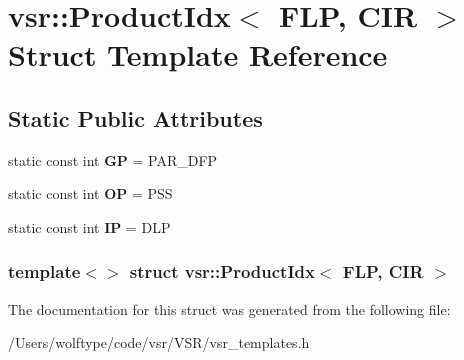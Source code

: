 \hypertarget{structvsr_1_1_product_idx_3_01_f_l_p_00_01_c_i_r_01_4}{\section{vsr\-:\-:Product\-Idx$<$ F\-L\-P, C\-I\-R $>$ Struct Template Reference}
\label{structvsr_1_1_product_idx_3_01_f_l_p_00_01_c_i_r_01_4}
}
\subsection*{Static Public Attributes}
\begin{DoxyCompactItemize}
\item 
\hypertarget{structvsr_1_1_product_idx_3_01_f_l_p_00_01_c_i_r_01_4_a8091c777c1fb0f840159f4b951df6246}{static const int {\bfseries G\-P} = P\-A\-R\-\_\-\-D\-F\-P}\label{structvsr_1_1_product_idx_3_01_f_l_p_00_01_c_i_r_01_4_a8091c777c1fb0f840159f4b951df6246}

\item 
\hypertarget{structvsr_1_1_product_idx_3_01_f_l_p_00_01_c_i_r_01_4_afa97fcc7e5626d7f9fc98458ee85b2f4}{static const int {\bfseries O\-P} = P\-S\-S}\label{structvsr_1_1_product_idx_3_01_f_l_p_00_01_c_i_r_01_4_afa97fcc7e5626d7f9fc98458ee85b2f4}

\item 
\hypertarget{structvsr_1_1_product_idx_3_01_f_l_p_00_01_c_i_r_01_4_a034552a8328958a8d0b146848c4a73db}{static const int {\bfseries I\-P} = D\-L\-P}\label{structvsr_1_1_product_idx_3_01_f_l_p_00_01_c_i_r_01_4_a034552a8328958a8d0b146848c4a73db}

\end{DoxyCompactItemize}
\subsubsection*{template$<$$>$ struct vsr\-::\-Product\-Idx$<$ F\-L\-P, C\-I\-R $>$}



The documentation for this struct was generated from the following file\-:\begin{DoxyCompactItemize}
\item 
/\-Users/wolftype/code/vsr/\-V\-S\-R/vsr\-\_\-templates.\-h\end{DoxyCompactItemize}
